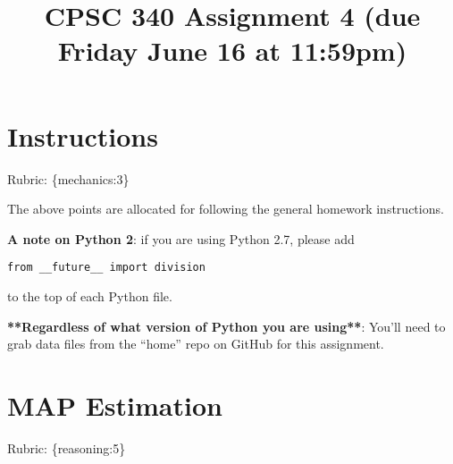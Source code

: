 \documentclass{article}
\begin{document}
\def\blu#1{{\color{blu}#1}}
\def\gre#1{{\color{gre}#1}}
\def\red#1{{\color{red}#1}}
\def\norm#1{\|#1\|}
\newcommand{\argmin}[1]{\mathop{\hbox{argmin}}_{#1}}
\newcommand{\argmax}[1]{\mathop{\hbox{argmax}}_{#1}}
\def\R{\mathbb{R}}
\newcommand{\fig}[2]{\texttt{[image: \#2]}}
\newcommand{\centerfig}[2]{\begin{center}\texttt{[image: \#2]}\end{center}}
\def\items#1{\begin{itemize}#1\end{itemize}}
\def\enum#1{\begin{enumerate}#1\end{enumerate}}
\newcommand{\half}{\frac 1 2}
\def\argmax{\mathop{\rm arg\,max}}
\def\argmin{\mathop{\rm arg\,min}}
\def\rubric#1{\gre{Rubric: \{#1\}}}{}


\title{CPSC 340 Assignment 4 (due Friday June 16 at 11:59pm)}
\date{}
\maketitle

\vspace{-7em}

\section*{Instructions}
\rubric{mechanics:3}

The above points are allocated for following the general homework instructions.

\vspace{1em}

\textbf{A note on Python 2}: if you are using Python 2.7, please add
\begin{verbatim}
from __future__ import division
\end{verbatim}
to the top of each Python file. 

\textbf{**Regardless of what version of Python you are using**}:
You'll need to grab data files from the ``home'' repo on GitHub for this assignment.


\section{MAP Estimation}
\rubric{reasoning:5}
\end{document}
